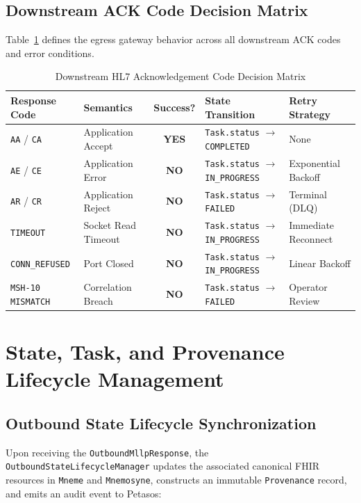 \subsection{Downstream ACK Code Decision Matrix}

Table~\ref{tab:egress_ack_decision} defines the egress gateway behavior across all downstream ACK codes and error conditions.

\begin{table}[htbp]
\centering
\small
\begin{tabularx}{\textwidth}{l l c p{4.5cm} p{2.5cm}}
\toprule
\textbf{Response Code} & \textbf{Semantics} & \textbf{Success?} & \textbf{State Transition} & \textbf{Retry Strategy} \\
\midrule
\texttt{AA} / \texttt{CA} & Application Accept & \textbf{YES} & \texttt{Task.status} $\to$ \texttt{COMPLETED} & None \\
\texttt{AE} / \texttt{CE} & Application Error & \textbf{NO} & \texttt{Task.status} $\to$ \texttt{IN\_PROGRESS} & Exponential Backoff \\
\texttt{AR} / \texttt{CR} & Application Reject & \textbf{NO} & \texttt{Task.status} $\to$ \texttt{FAILED} & Terminal (DLQ) \\
\texttt{TIMEOUT} & Socket Read Timeout & \textbf{NO} & \texttt{Task.status} $\to$ \texttt{IN\_PROGRESS} & Immediate Reconnect \\
\texttt{CONN\_REFUSED} & Port Closed & \textbf{NO} & \texttt{Task.status} $\to$ \texttt{IN\_PROGRESS} & Linear Backoff \\
\texttt{MSH-10 MISMATCH} & Correlation Breach & \textbf{NO} & \texttt{Task.status} $\to$ \texttt{FAILED} & Operator Review \\
\bottomrule
\end{tabularx}
\caption{Downstream HL7 Acknowledgement Code Decision Matrix}
\label{tab:egress_ack_decision}
\end{table}

\section{State, Task, and Provenance Lifecycle Management}
\label{sec:egress_lifecycle}

\subsection{Outbound State Lifecycle Synchronization}

Upon receiving the \texttt{OutboundMllpResponse}, the \texttt{OutboundStateLifecycleManager} updates the associated canonical FHIR resources in \texttt{Mneme} and \texttt{Mnemosyne}, constructs an immutable \texttt{Provenance} record, and emits an audit event to Petasos:

